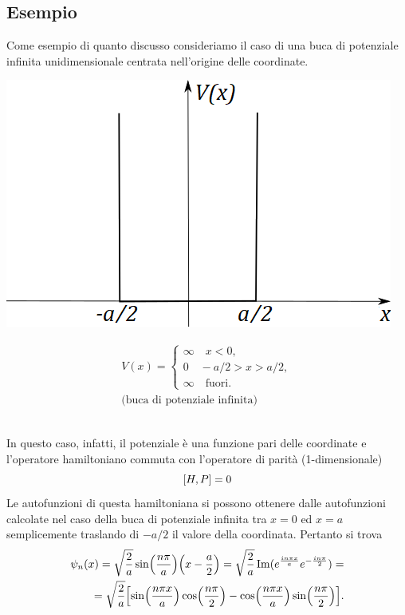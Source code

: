 \documentclass[a4paper,12pt,oneside]{book}
\begin{document}
\subsection*{Esempio}
Come esempio di quanto discusso consideriamo il caso di una buca di potenziale infinita unidimensionale centrata nell'origine delle coordinate.\\
\begin{minipage}{.4\textwidth}
\includegraphics[width=\textwidth]{immagini/cap_9/fig_9_1.png}	
\end{minipage}
\begin{minipage}{.55\textwidth}
\begin{align}
V(x)= 
\begin{cases}
\infty \quad x<0,\\
0 \quad -a/2>x>a/2, \\
\infty \quad \textrm{fuori}.
\end{cases}
\\
\textrm{(buca di potenziale infinita)} \nonumber
\end{align}
\end{minipage}\\
In questo caso, infatti, il potenziale è una funzione pari delle coordinate e l'operatore hamiltoniano commuta con l'operatore di parità (1-dimensionale)
\begin{equation}
  \comm {H}{P}= 0
\end{equation}
Le autofunzioni di questa hamiltoniana si possono ottenere dalle autofunzioni calcolate nel caso della buca di potenziale infinita tra $x=0$ ed $x=a$ semplicemente traslando di $-a/2$ il valore della coordinata. Pertanto si trova
\begin{align}
  \psi_n(x) = \sqrt{\frac{2}{a}}\sin(\frac{n\pi}{a})\qty(x-\frac{a}{2})= \sqrt{\frac{2}{a}}\Im(e^{\frac{in\pi x}{a}}e^{-\frac{in\pi}{2}})=\nonumber\\
  =\sqrt{\frac{2}{a}}\qty[\sin(\frac{n\pi x}{a})\cos(\frac{n\pi}{2})-\cos(\frac{n\pi x}{a})\sin(\frac{n\pi}{2})] .
\end{align}
\end{document}
